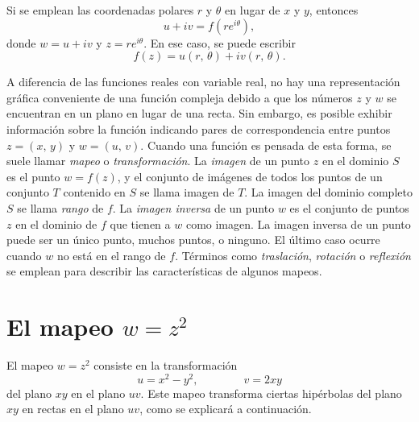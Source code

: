 \documentclass[a4paper]{report}
\begin{document}
Si se emplean las coordenadas polares \(r\) y \(\theta\) en lugar de \(x\) y \(y\), entonces
\[
 u+iv=f(re^{i\theta}),
\]
donde \(w=u+iv\) y \(z=re^{i\theta}\). En ese caso, se puede escribir
\[
 f(z)=u(r,\,\theta)+iv(r,\,\theta).
\]

A diferencia de las funciones reales con variable real, no hay una representación gráfica conveniente de una función compleja debido a que los números \(z\) y \(w\) se encuentran en un plano en lugar de una recta. Sin embargo, es posible exhibir información sobre la función indicando pares de correspondencia entre puntos \(z=(x,\,y)\) y \(w=(u,\,v)\). Cuando una función es pensada de esta forma, se suele llamar \emph{mapeo} o \emph{transformación}. La \emph{imagen} de un punto \(z\) en el dominio \(S\) es el punto \(w=f(z)\), y el conjunto de imágenes de todos los puntos de un conjunto \(T\) contenido en \(S\) se llama imagen de \(T\). La imagen del dominio completo \(S\) se llama \emph{rango} de \(f\). La \emph{imagen inversa} de un punto \(w\) es el conjunto de puntos \(z\) en el dominio de \(f\) que tienen a \(w\) como imagen. La imagen inversa de un punto puede ser un único punto, muchos puntos, o ninguno. El último caso ocurre cuando \(w\) no está en el rango de \(f\). Términos como \emph{traslación}, \emph{rotación} o \emph{reflexión} se emplean para describir las características de algunos mapeos.

\section{El mapeo \texorpdfstring{\(w=z^2\)}{w=z2}}\label{sec:square_mapping}

El mapeo \(w=z^2\) consiste en la transformación
\begin{equation}\label{eq:square_mapping}
  u=x^2-y^2,\qquad\qquad v=2xy
\end{equation}
del plano \(xy\) en el plano \(uv\). Este mapeo transforma ciertas hipérbolas del plano \(xy\) en rectas en el plano \(uv\), como se explicará a continuación.
\end{document}

